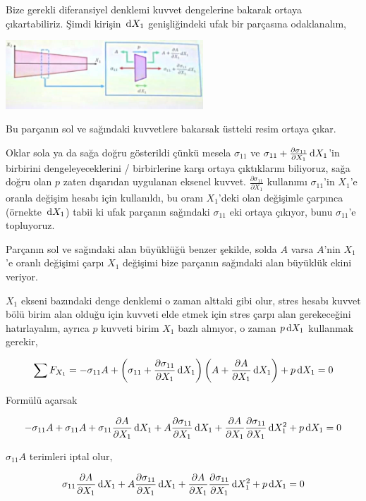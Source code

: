 \documentclass[12pt,fleqn]{article}\usepackage{../../common}
\begin{document}
Bize gerekli diferansiyel denklemi kuvvet dengelerine bakarak ortaya
çıkartabiliriz. Şimdi kirişin $\,\mathrm{d} X_1$ genişliğindeki ufak bir parçasına
odaklanalım,

\includegraphics[width=20em]{phy_020_strs_04_07.jpg}

Bu parçanın sol ve sağındaki kuvvetlere bakarsak üstteki resim ortaya çıkar.

Oklar sola ya da sağa doğru gösterildi çünkü mesela $\sigma_{11}$ ve
$\sigma_{11} + \frac{\partial \sigma_{11}}{\partial X_1} \,\mathrm{d} X_1$'in
birbirini dengeleyeceklerini / birbirlerine karşı ortaya çıktıklarını
biliyoruz, sağa doğru olan $p$ zaten dışarıdan uygulanan eksenel kuvvet.
$\frac{\partial \sigma_{11}}{\partial X_1}$ kullanımı $\sigma_{11}$'in
$X_1$'e oranla değişim hesabı için kullanıldı, bu oranı $X_1$'deki
olan değişimle çarpınca (örnekte $\,\mathrm{d} X_1$) tabii ki ufak parçanın sağındaki
$\sigma_{11}$ eki ortaya çıkıyor, bunu $\sigma_{11}$'e topluyoruz.

Parçanın sol ve sağındaki alan büyüklüğü benzer şekilde, solda $A$ varsa
$A$'nin $X_1$'e oranlı değişimi çarpı $X_1$ değişimi bize parçanın sağındaki
alan büyüklük ekini veriyor. 

$X_1$ ekseni bazındaki denge denklemi o zaman alttaki gibi olur, stres hesabı
kuvvet bölü birim alan olduğu için kuvveti elde etmek için stres çarpı alan
gerekeceğini hatırlayalım, ayrıca $p$ kuvveti birim $X_1$ bazlı alınıyor,
o zaman $p \,\mathrm{d} X_1$ kullanmak gerekir,

$$ \sum F_{X_1} = - \sigma_{11} A +
\left( \sigma_{11} + \frac{\partial \sigma_{11}}{\partial X_1} \,\mathrm{d} X_1  \right)
\left( A + \frac{\partial A}{\partial X_1} \,\mathrm{d} X_1  \right) + p \,\mathrm{d} X_1 = 0
$$

Formülü açarsak

$$
-\sigma_{11} A  + \sigma_{11} A  +
\sigma_{11} \frac{\partial A}{\partial X_1} \,\mathrm{d} X_1 +
A \frac{\partial \sigma_{11}}{\partial X_1} \,\mathrm{d} X_1 +
\frac{\partial A}{\partial X_1} \frac{\partial \sigma_{11}}{\partial X_1} \,\mathrm{d} X_1^2 +
p \,\mathrm{d} X_1 = 0
$$

$\sigma_{11} A$ terimleri iptal olur,

$$
\sigma_{11} \frac{\partial A}{\partial X_1} \,\mathrm{d} X_1 +
A \frac{\partial \sigma_{11}}{\partial X_1} \,\mathrm{d} X_1 +
\frac{\partial A}{\partial X_1} \frac{\partial \sigma_{11}}{\partial X_1} \,\mathrm{d} X_1^2 +
p \,\mathrm{d} X_1 = 0
$$
\end{document}
